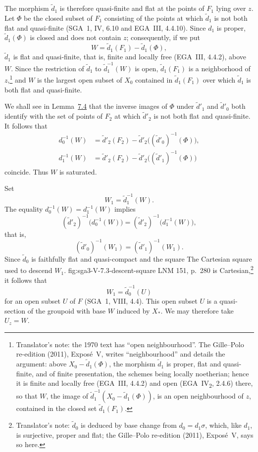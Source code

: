 
The morphism \(\widetilde d_1\) is therefore quasi-finite and flat at
the points of \(F_1\) lying over \(z\). Let \(\Phi\) be the closed subset of
\(F_1\) consisting of the points at which \(\widetilde d_1\) is not both flat
and quasi-finite (SGA~1, IV, 6.10 and EGA~III, 4.4.10). Since \(d_1\) is
proper, \(\widetilde d_1(\Phi)\) is closed and does not contain \(z\);
consequently, if we put
\[
  W=\widetilde d_1(F_1)-\widetilde d_1(\Phi),
\]
\(\widetilde d_1\) is flat and quasi-finite, that is, finite and locally
free (EGA~III, 4.4.2), above \(W\). Since the restriction of \(\widetilde d_1\)
to \(\widetilde d_1^{-1}(W)\) is open, \(\widetilde d_1(F_1)\) is a
neighborhood of \(z\),\footnote{Translator's note: the 1970 text has ``open neighbourhood''. The
Gille--Polo re-edition (2011), Exposé~V, writes ``neighbourhood'' and details
the argument: above \(X_0-\widetilde d_1(\Phi)\), the morphism \(\widetilde d_1\) is
proper, flat and quasi-finite, and of finite presentation, the schemes
being locally noetherian; hence it is finite and locally free (EGA~III,
4.4.2) and open (EGA~IV\textsubscript{2}, 2.4.6) there, so that \(W\), the image of
\(\widetilde d_1^{-1}(X_0-\widetilde d_1(\Phi))\), is an open neighbourhood of \(z\),
contained in the closed set \(\widetilde d_1(F_1)\).} and \(W\) is the largest open subset of \(X_0\)
contained in \(\widetilde d_1(F_1)\) over which \(\widetilde d_1\) is both flat
and quasi-finite.

We shall see in Lemma~\hyperref[lem:sga3-V-7.4]{7.4} that the inverse
images of \(\Phi\) under \(\widetilde d'_1\) and
\(\widetilde d'_0\) both identify with the set of points of \(F_2\)
at which \(\widetilde d'_2\) is not both flat and quasi-finite.
It follows that
\[
\begin{aligned}
  d_0^{-1}(W)
  &=
  \widetilde d'_2(F_2)
  -
  \widetilde d'_2\bigl((\widetilde d'_0)^{-1}(\Phi)\bigr),\\
  d_1^{-1}(W)
  &=
  \widetilde d'_2(F_2)
  -
  \widetilde d'_2\bigl((\widetilde d'_1)^{-1}(\Phi)\bigr)
\end{aligned}
\]
coincide. Thus \(W\) is saturated.

Set
\[
  W_1=\widetilde d_1^{-1}(W).
\]
The equality \(d_0^{-1}(W)=d_1^{-1}(W)\) implies
\[
  (\widetilde d'_2)^{-1}\bigl(d_0^{-1}(W)\bigr)
  =
  (\widetilde d'_2)^{-1}\bigl(d_1^{-1}(W)\bigr),
\]
that is,
\[
  (\widetilde d'_0)^{-1}(W_1)
  =
  (\widetilde d'_1)^{-1}(W_1).
\]
Since \(\widetilde d_0\) is faithfully flat and quasi-compact and the
square
  {The Cartesian square used to descend \(W_1\).}
  {fig:sga3-V-7.3-descent-square}
  {LNM 151, p.~280}
is Cartesian,\footnote{Translator's note: \(\widetilde d_0\) is deduced by base change from
\(d_0=d_1\sigma\), which, like \(d_1\), is surjective, proper and flat; the
Gille--Polo re-edition (2011), Exposé~V, says so here.} it follows that
\[
  W_1=\widetilde d_0^{-1}(U)
\]
for an open subset \(U\) of \(F\) (SGA~1, VIII, 4.4). This open
subset \(U\) is a quasi-section of the groupoid with base \(W\)
induced by \(X_\ast\). We may therefore take \(U_z=W\).


